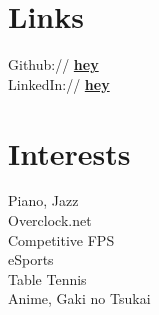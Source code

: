 \documentclass[]{peter_resume}
\begin{document}
\begin{minipage}[t]{0.22\textwidth}






\vspace{1.9cm}

\section{Links} 
Github:// \href{https://github.com/hey}{\bf hey} \\
LinkedIn://  \href{https://www.linkedin.com/in/hey}{\bf hey} \\
\sectionsep


\section{Interests} 
Piano, Jazz \\
Overclock.net \\
Competitive FPS \\
eSports \\
Table Tennis \\
Anime, Gaki no Tsukai \\
\sectionsep

\end{minipage} 
\end{document}
